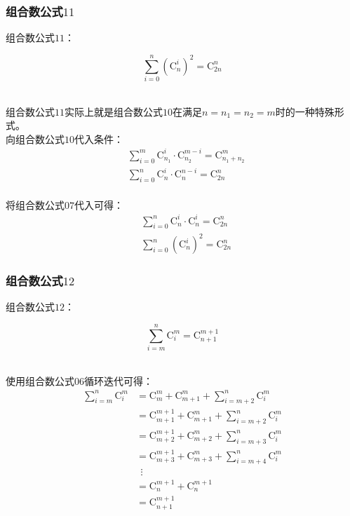\documentclass[UTF8]{ctexart}
\begin{document}
\subsubsection{组合数公式$11$}
    组合数公式$11$：
    \begin{large}
        \begin{equation*}
            \sum_{i=0}^{n}\left(\mathrm{C}_n^i\right)^2=\mathrm{C}_{2n}^{n}
        \end{equation*}
    \end{large}\\
    组合数公式$11$实际上就是组合数公式$10$在满足$n=n_1=n_2=m$时的一种特殊形式。\\[3mm]
    向组合数公式$10$代入条件：\vspace{5pt}
    \setcounter{equation}{0}
    \begin{align}
        &\sum_{i=0}^m\mathrm{C}_{n_1}^i\cdot\mathrm{C}_{n_2}^{m-i}=\mathrm{C}_{n_1+n_2}^m\\[3mm]
        &\sum_{i=0}^n\mathrm{C}_{n}^i\cdot\mathrm{C}_{n}^{n-i}=\mathrm{C}_{2n}^n
    \end{align}\\
    将组合数公式$07$代入可得：
    \begin{align}
        &\sum_{i=0}^n\mathrm{C}_{n}^i\cdot\mathrm{C}_{n}^{i}=\mathrm{C}_{2n}^n\\[3mm]
        &\sum_{i=0}^{n}\left(\mathrm{C}_n^i\right)^2=\mathrm{C}_{2n}^{n}
    \end{align}

\newpage

\subsubsection{组合数公式$12$}
    组合数公式$12$：
    \begin{large}
        \begin{equation*}
            \sum_{i=m}^n\mathrm{C}_i^m=\mathrm{C}_{n+1}^{m+1}
        \end{equation*}
    \end{large}\\
    使用组合数公式$06$循环迭代可得：\vspace{5pt}
    \setcounter{equation}{0}
    \begin{align}
        \sum_{i=m}^n\mathrm{C}_i^m
        &=\mathrm{C}_m^m+\mathrm{C}_{m+1}^{m}+\sum_{i=m+2}^n\mathrm{C}_i^m\\[3mm]
        &=\mathrm{C}_{m+1}^{m+1}+\mathrm{C}_{m+1}^{m}+\sum_{i=m+2}^n\mathrm{C}_i^m\\[3mm]
        &=\mathrm{C}_{m+2}^{m+1}+\mathrm{C}_{m+2}^{m}+\sum_{i=m+3}^n\mathrm{C}_i^m\\[3mm]
        &=\mathrm{C}_{m+3}^{m+1}+\mathrm{C}_{m+3}^{m}+\sum_{i=m+4}^n\mathrm{C}_i^m\\[3mm]
        &~~\vdots\\[5mm]
        &=\mathrm{C}_n^{m+1}+\mathrm{C}_n^{m+1}\\[5mm]
        &=\mathrm{C}_{n+1}^{m+1}
    \end{align}
\end{document}
